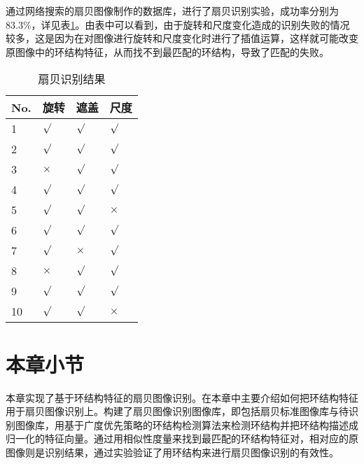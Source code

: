 通过网络搜索的扇贝图像制作的数据库，进行了扇贝识别实验，成功率分别为$83.3\%$，详见表\ref{tab:recognition}。由表中可以看到，由于旋转和尺度变化造成的识别失败的情况较多，这是因为在对图像进行旋转和尺度变化时进行了插值运算，这样就可能改变原图像中的环结构特征，从而找不到最匹配的环结构，导致了匹配的失败。
\begin{table}
\caption{扇贝识别结果}
\centering
\begin{tabular}{p{1cm}<{\centering}p{1cm}<{\centering}p{1cm}<{\centering}p{1cm}<{\centering}}
  \hline
  No. & 旋转 & 遮盖 & 尺度\\
  \hline
  \rowcolor{gray!50}
  1 & $\surd$  & $\surd$     & $\surd$ \\
  2 & $\surd$  & $\surd$     & $\surd$ \\
  \rowcolor{gray!50}
  3 & $\times$  & $\surd$  & $\surd$\\
  4 & $\surd$  & $\surd$  & $\surd$ \\
  \rowcolor{gray!50}
  5 & $\surd$     & $\surd$     & $\times$\\
  6 & $\surd$      & $\surd$      & $\surd$\\
  \rowcolor{gray!50}
  7 & $\surd$  & $\times$      & $\surd$  \\
  8 & $\times$  & $\surd$  & $\surd$ \\
  \rowcolor{gray!50}
  9 & $\surd$ & $\surd$  & $\surd$\\
  10 & $\surd$  & $\surd$  & $\times$ \\
  \hline
\end{tabular}
\label{tab:recognition}
\end{table}

\section{本章小节}
\label{}
本章实现了基于环结构特征的扇贝图像识别。在本章中主要介绍如何把环结构特征用于扇贝图像识别上。构建了扇贝图像识别图像库，即包括扇贝标准图像库与待识别图像库，用基于广度优先策略的环结构检测算法来检测环结构并把环结构描述成归一化的特征向量。通过用相似性度量来找到最匹配的环结构特征对，相对应的原图像则是识别结果，通过实验验证了用环结构来进行扇贝图像识别的有效性。

